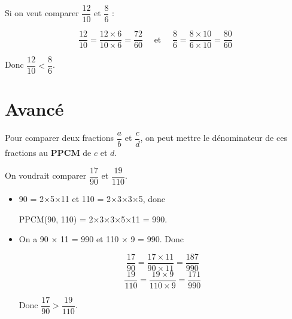 \documentclass[../€Cours-complet/Cours-complet]{subfiles}
\begin{document}
\begin{exemple}
	Si on veut comparer $\dfrac{12}{10}$ et $\dfrac{8}{6}$ :

	$$ \dfrac{12}{10} = \dfrac{12 × 6}{10 × 6} = \dfrac{72}{60} \hspace{1em}\text{ et }\hspace{1em} \dfrac{8}{6} = \dfrac{8 × 10}{6 × 10} = \dfrac{80}{60} $$

	Donc $\dfrac{12}{10} < \dfrac{8}{6}$.
\end{exemple}

\newpage

\section*{Avancé}

\begin{methode}
	Pour comparer deux fractions $\dfrac{a}{b}$ et $\dfrac{c}{d}$, on peut mettre le dénominateur de ces fractions au \textbf{PPCM} de $c$ et $d$.
\end{methode}

\begin{exemple}
	On voudrait comparer $\dfrac{17}{90}$ et $\dfrac{19}{110}$.
	\begin{itemize}
		\item 90 = 2×5×11 et 110 = 2×3×3×5, donc

		      PPCM(90, 110) = 2×3×3×5×11 = 990.
		\item On a 90 × 11 = 990 et 110 × 9 = 990. Donc

		      $$ \dfrac{17}{90} = \dfrac{17 × 11}{90 × 11} = \dfrac{187}{990} $$
		      $$ \dfrac{19}{110} = \dfrac{19 × 9}{110 × 9} = \dfrac{171}{990} $$

		      Donc $\dfrac{17}{90} > \dfrac{19}{110}$.
	\end{itemize}
\end{exemple}
\end{document}

